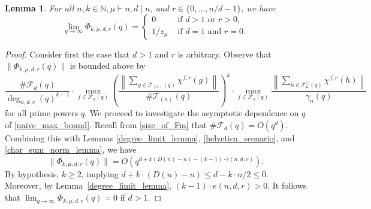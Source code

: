 \documentclass[10pt]{article}
\newtheorem{lemma}[theorem]{Lemma}
\theoremstyle{definition}
\newcommand{\CF}{\mathcal{F}}
\newcommand{\N}{\mathbb{N}}
\newcommand{\CT}{\mathcal{T}}
\begin{document}
\begin{lemma}
\label{Phi_behavior}
For all \(n,k \in \N, \mu \vdash n, d \mid n\), and \(r \in \{0,\ldots,n/d-1\}\), we have
\begin{equation}
\lim_{q \to \infty}
\Phi_{k,\mu,d,r} (q)
=
\begin{cases}
0         & \text{ if } d > 1 \text{ or }  r > 0, \\
1 / z_\mu & \text{ if } d = 1 \text{ and } r = 0.
\end{cases}
\end{equation}
\end{lemma}

\begin{proof}
Consider first the case that \(d > 1\) and \(r\) is arbitrary.
Observe that
\(
\|
\Phi_{k,\mu,d,r} (q)
\|
\)
is bounded above by
\begin{equation}
\label{naive_max_bound}
\frac{
\# \CF_d (q)
}{
\deg_{n,d,r} (q)^{k-1}
}
\cdot
\max_{f \in \CF_d (q)}
\left (
\frac{\left \| \sum_{g \in \CT_{(n)}(q)} \chi^{f,r}(g) \right \|}{\# \CT_{(n)}(q)}
\right )^k
\cdot
\max_{f \in \CF_d(q)}
\frac{\left \| \sum_{h \in \CT^\Box_\mu(q)} \chi^{f,r}(h) \right \|}{\gamma_n(q)}
\end{equation}
for all prime powers \(q\).
We proceed to investigate the asymptotic dependence on \(q\) of \eqref{naive_max_bound}.
Recall from \eqref{size_of_Fm} that \(\# \CF_d (q) = O(q^d)\).
Combining this with Lemmas \ref{degree_limit_lemma},
\ref{helvetica_scenario},
and
\ref{char_sum_norm_lemma},
we have
\begin{equation}
\| \Phi_{k,\mu,d,r} (q) \|
=
O \left ( q^{d + k (D(n) - n) - (k-1) \cdot e(n,d,r)} \right ).
\end{equation}
By hypothesis, \(k \geq 2\), implying \(d  + k \cdot (D(n) - n) \leq d - k \cdot n/2 \leq 0\).
Moreover, by Lemma~\ref{degree_limit_lemma}, \((k-1)\cdot e(n,d,r) > 0\).
It follows that \(\lim_{q \to \infty} \Phi_{k,\mu,d,r} (q) = 0\) if \(d > 1\).


\end{proof}
\end{document}
